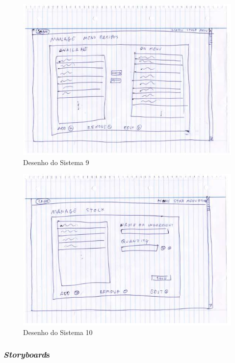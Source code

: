 \begin{figure}[!hbt]
    \centering
    \includegraphics[width=14cm]{Resources/Previous/image-098.jpg}
    \caption{Desenho do Sistema 9}
    
\end{figure}
\FloatBarrier
\begin{figure}[!hbt]
    \centering
    \includegraphics[width=14cm]{Resources/Previous/image-099.jpg}
    \caption{Desenho do Sistema 10}
    
\end{figure}
\FloatBarrier

\subsubsection{\textit{Storyboard}s}

